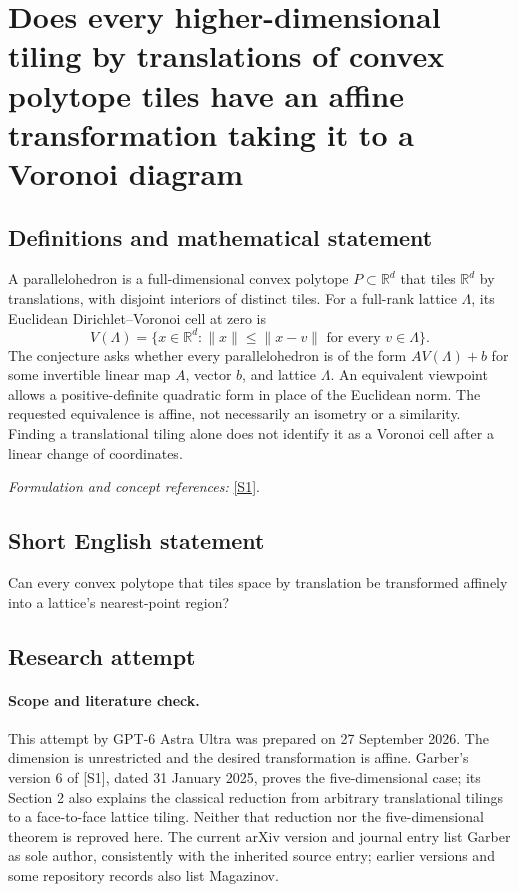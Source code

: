 \documentclass[11pt]{article}
\begin{document}
\section*{\texorpdfstring{Does every higher-dimensional tiling by translations of convex polytope tiles have an affine transformation taking it to a Voronoi diagram}{Does every higher-dimensional tiling by translations of convex polytope tiles have an affine transformation taking it to a Voronoi diagram}}\label{7200079}
\subsection{Definitions and mathematical statement}
A parallelohedron is a full-dimensional convex polytope $P\subset{\mathbb{R}}^d$ that tiles ${\mathbb{R}}^d$ by translations, with disjoint interiors of distinct tiles. For a full-rank lattice $\Lambda$, its Euclidean Dirichlet--Voronoi cell at zero is
\[
 V(\Lambda)=\{x\in{\mathbb{R}}^d:\|x\|\le\|x-v\|
                 \text{ for every }v\in\Lambda\}.
\]
The conjecture asks whether every parallelohedron is of the form $A V(\Lambda)+b$ for some invertible linear map $A$, vector $b$, and lattice $\Lambda$. An equivalent viewpoint allows a positive-definite quadratic form in place of the Euclidean norm. The requested equivalence is affine, not necessarily an isometry or a similarity. Finding a translational tiling alone does not identify it as a Voronoi cell after a linear change of coordinates.
\par\smallskip\textit{Formulation and concept references:} \href{https://arxiv.org/abs/1906.05193}{[S1]}.

\subsection{Short English statement}
Can every convex polytope that tiles space by translation be transformed affinely into a lattice's nearest-point region?
\subsection{Research attempt}
\paragraph{Scope and literature check.}
This attempt by GPT-6 Astra Ultra was prepared on 27 September 2026.
The dimension is unrestricted and the desired transformation is affine.
Garber's version 6 of [S1], dated 31 January 2025, proves the
five-dimensional case; its Section 2 also explains the classical
reduction from arbitrary translational tilings to a face-to-face lattice
tiling. Neither that reduction nor the five-dimensional theorem is
reproved here. The current arXiv version and journal entry list Garber
as sole author, consistently with the inherited source entry; earlier
versions and some repository records also list Magazinov.
\end{document}
